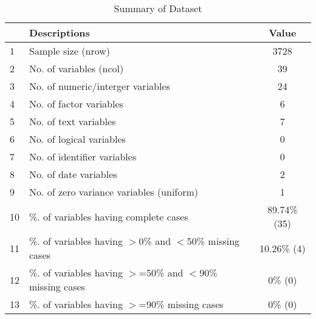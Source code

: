\begin{table}[ht]
\centering
\caption{Summary of Dataset} 
\begin{tabular}{llc}
  \hline
 & Descriptions & Value \\ 
  \hline
1 & Sample size (nrow) & 3728 \\ 
  2 & No. of variables (ncol) & 39 \\ 
  3 & No. of numeric/interger variables & 24 \\ 
  4 & No. of factor variables & 6 \\ 
  5 & No. of text variables & 7 \\ 
  6 & No. of logical variables & 0 \\ 
  7 & No. of identifier variables & 0 \\ 
  8 & No. of date variables & 2 \\ 
  9 & No. of zero variance variables (uniform) & 1 \\ 
  10 & \%. of variables having complete cases & 89.74\% (35) \\ 
  11 & \%. of variables having $>$0\% and $<$50\% missing cases & 10.26\% (4) \\ 
  12 & \%. of variables having $>$=50\% and $<$90\% missing cases & 0\% (0) \\ 
  13 & \%. of variables having $>$=90\% missing cases & 0\% (0) \\ 
   \hline
\end{tabular}
\end{table}
